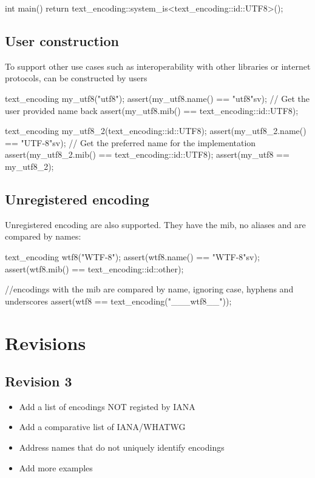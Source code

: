 \documentclass{wg21}
\begin{document}
\begin{colorblock}
int main() {
    return text_encoding::system_is<text_encoding::id::UTF8>();
}
\end{colorblock}




\subsection{User construction}

To support other use cases such as interoperability with other libraries or internet protocols,
 can be constructed by users

\begin{colorblock}
text_encoding my_utf8("utf8");
assert(my_utf8.name() == "utf8"sv); // Get the user provided name back
assert(my_utf8.mib() == text_encoding::id::UTF8);

text_encoding my_utf8_2(text_encoding::id::UTF8);
assert(my_utf8_2.name() == "UTF-8"sv); // Get the preferred name for the implementation
assert(my_utf8_2.mib() == text_encoding::id::UTF8);
assert(my_utf8 == my_utf8_2);
\end{colorblock}

\subsection{Unregistered encoding}

Unregistered encoding are also supported. They have the  mib, no aliases and are compared
by names:

\begin{colorblock}
text_encoding wtf8("WTF-8");
assert(wtf8.name() == "WTF-8"sv);
assert(wtf8.mib() == text_encoding::id::other);

//encodings with the  mib are compared by name, ignoring case, hyphens and underscores
assert(wtf8 == text_encoding("___wtf8__"));
\end{colorblock}


\section{Revisions}

\subsection*{Revision 3}
\begin{itemize}
    \item Add a list of encodings NOT registed by IANA 
    \item Add a comparative list of IANA/WHATWG
    \item Address names that do not uniquely identify encodings
    \item Add more examples
\end{itemize}
\end{document}

